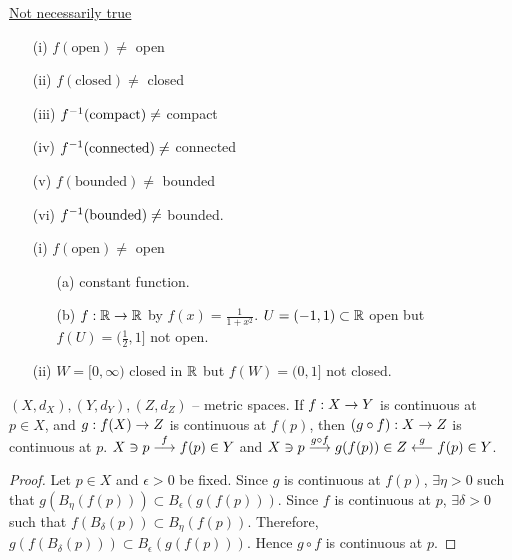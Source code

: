 \documentclass[]{article}
\begin{document}
\begin{remark}
	\ul{Not necessarily true}
	\begin{enumerate}
		\item[(i)] $f(\text{open}) \neq $ open
		\item[(ii)] $f(\text{closed}) \neq $ closed
		\item[(iii)] $f^{-1}(\text{compact}) \neq $ compact
		\item[(iv)] $f^{-1}(\text{connected}) \neq $ connected
		\item[(v)] $f(\text{bounded}) \neq $ bounded
		\item[(vi)] $f^{-1}(\text{bounded}) \neq $ bounded.
	\end{enumerate}
\end{remark}
\begin{example}
	\begin{enumerate}
		\item[(i)] $f(\text{open}) \neq $ open
			\begin{enumerate}
				\item[(a)] constant function.
				\item[(b)] $f:\mathbb{R}\rightarrow\mathbb{R}$ by $f(x) = \frac1{1+x^2}$.
					$U = (-1,1)\subset\mathbb{R}$ open but $f(U) = (\frac12,1]$ not open.
			\end{enumerate}
		\item[(ii)] $W = [0,\infty)$ closed in $\mathbb{R}$ but $f(W) = (0,1]$ not closed.
	\end{enumerate}
\end{example}

\begin{theorem}
	\label{thm-4-7}
	$(X,d_X),(Y,d_Y),(Z,d_Z)$ -- metric spaces.
	If $f:X\rightarrow Y$ is continuous at $p\in X$, and $g:f(X)\rightarrow Z$ is continuous at $f(p)$, then $(g\circ f): X\rightarrow Z$ is continuous at $p$.
	$ X\ni p \overset{f}{\longrightarrow} f(p)\in Y$ and $X\ni p \overset{g\circ f}{\longrightarrow} g(f(p))\in Z \overset{g}{\longleftarrow} f(p)\in Y$.
\end{theorem}
\begin{proof}
	Let $p\in X$ and $\epsilon>0$ be fixed.
	Since $g$ is continuous at $f(p)$, $\exists\eta>0$ such that $g(B_\eta(f(p)))\subset B_\epsilon(g(f(p)))$.
	Since $f$ is continuous at $p$, $\exists\delta>0$ such that $f(B_\delta(p))\subset B_\eta(f(p))$.
	Therefore, $g(f(B_\delta(p)))\subset B_\epsilon(g(f(p)))$.
	Hence $g\circ f$ is continuous at $p$.
\end{proof}
\end{document}
